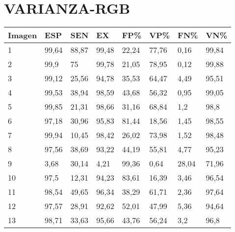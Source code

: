 \section{VARIANZA-RGB}
\begin{longtable}[c]{|l|l|l|l|l|l|l|l|}
\hline
\textbf{Imagen} & \textbf{ESP} & \textbf{SEN} & \textbf{EX} & \textbf{FP\%} & \textbf{VP\%} & \textbf{FN\%} & \textbf{VN\%} \\ \hline
\endfirsthead
%
\endhead
%
1               & 99,64        & 88,87        & 99,48       & 22,24         & 77,76         & 0,16          & 99,84         \\ \hline
2               & 99,9         & 75           & 99,78       & 21,05         & 78,95         & 0,12          & 99,88         \\ \hline
3               & 99,12        & 25,56        & 94,78       & 35,53         & 64,47         & 4,49          & 95,51         \\ \hline
4               & 99,53        & 38,94        & 98,59       & 43,68         & 56,32         & 0,95          & 99,05         \\ \hline
5               & 99,85        & 21,31        & 98,66       & 31,16         & 68,84         & 1,2           & 98,8          \\ \hline
6               & 97,18        & 30,96        & 95,83       & 81,44         & 18,56         & 1,45          & 98,55         \\ \hline
7               & 99,94        & 10,45        & 98,42       & 26,02         & 73,98         & 1,52          & 98,48         \\ \hline
8               & 97,56        & 38,69        & 93,22       & 44,19         & 55,81         & 4,77          & 95,23         \\ \hline
9               & 3,68         & 30,14        & 4,21        & 99,36         & 0,64          & 28,04         & 71,96         \\ \hline
10              & 97,5         & 12,31        & 94,23       & 83,61         & 16,39         & 3,46          & 96,54         \\ \hline
11              & 98,54        & 49,65        & 96,34       & 38,29         & 61,71         & 2,36          & 97,64         \\ \hline
12              & 97,57        & 28,91        & 92,62       & 52,01         & 47,99         & 5,36          & 94,64         \\ \hline
13              & 98,71        & 33,63        & 95,66       & 43,76         & 56,24         & 3,2           & 96,8          \\ \hline

\end{longtable}
